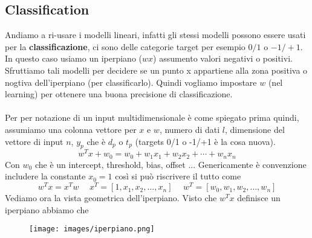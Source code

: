 \subsection{Classification}
Andiamo a ri-usare i modelli lineari, infatti gli stessi modelli possono essere usati per la \textbf{classificazione}, ci sono delle categorie target per esempio $0/1$ o $-1/+1$. In questo caso usiamo
un iperpiano ($wx$) assumento valori negativi o positivi. Sfruttiamo tali modelli per decidere se un punto x appartiene alla zona positiva o nogtiva 
dell'iperpiano (per classificarlo). Quindi vogliamo impostare $w$ (nel learning) per ottenere una buona precisione di classificazione.\\\\
Per per notazione di un input multidimensionale è come spiegato prima quindi, assumiamo una colonna vettore per $x$ e $w$, numero di dati $l$, dimensione
del vettore di input $n$, $y_p$ che è $d_p$ o $t_p$ (targets 0/1 o -1/+1 è la cosa nuova).
$$w^Tx + w_0 = w_0 + w_1x_1 + w_2 x_2 + \cdots + w_n x_n$$
Con $w_0$ che è un intercept, threshold, bias, offset ... Genericamente è convenzione includere la constante $x_0 = 1$ così si può riscrivere il tutto come
$$w^T x = x^T w \hspace{15pt} x^T = [1, x_1, x_2, \dots, x_n] \hspace{15pt} w^T = [w_0, w_1, w_2, \dots, w_n]$$ 
Vediamo ora la vista geometrica dell'iperpiano. Visto che $w^T x$ definisce un iperpiano abbiamo che
\begin{figure}[h!]
    \centering
    \texttt{[image: images/iperpiano.png]}
\end{figure}


